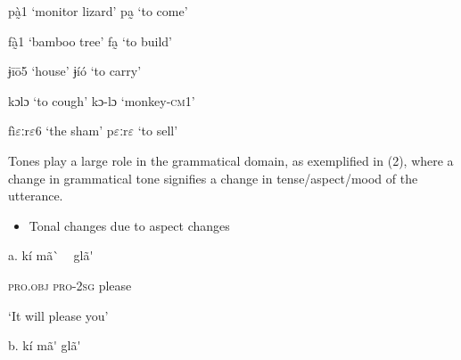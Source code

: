 \begin{styleindexi}
pà̰1 ‘monitor lizard’         pa̰     ‘to come’                          
\end{styleindexi}

\begin{styleindexi}
fà̰1 ‘bamboo tree’             fa̰       ‘to build’  
\end{styleindexi}

\begin{styleindexi}
                                  ɉīō5     ‘house’              ɉíó  ‘to carry’
\end{styleindexi}

\begin{styleindexi}
                                      kɔlɔ   ‘to cough’            kɔ-lɔ ‘monkey-\textsc{cm1}’
\end{styleindexi}

\begin{styleindexi}
fì$\varepsilon ː$r$\varepsilon $6 ‘the sham’                                            p$\varepsilon ː$r$\varepsilon $ ‘to sell’  
\end{styleindexi}

Tones play a large role in the grammatical domain, as exemplified in (2), where a change in grammatical tone signifies a change in tense/aspect/mood of the utterance. 

\begin{itemize}
\item \begin{styleindexi}
  \label{bkm:Ref499526405}Tonal changes due to aspect changes
\end{styleindexi}\end{itemize}
\begin{styleindexi}
a.   kí              mã\`{} ~           glã\'{} 
\end{styleindexi}

\begin{styleindexi}
    \textsc{pro}.\textsc{obj}     \textsc{pro}{}-2\textsc{sg}    please          
\end{styleindexi}

\begin{styleindexi}
    ‘It will please you’
\end{styleindexi}

\begin{styleindexi}
b.   kí               mã\'{}            glã\'{} 
\end{styleindexi}

